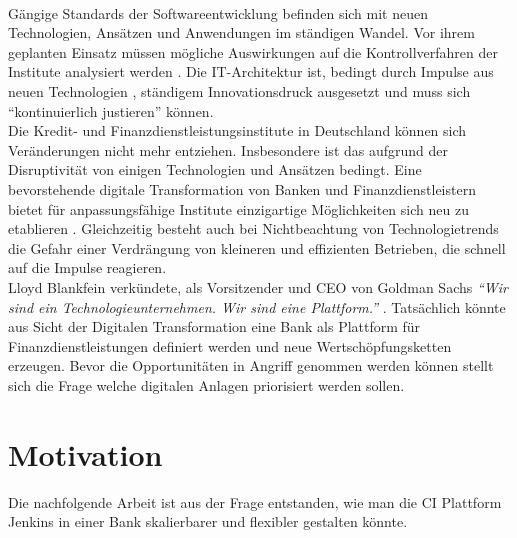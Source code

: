 \medskip
\\
Gängige Standards der Softwareentwicklung befinden sich mit neuen Technologien, Ansätzen und Anwendungen im ständigen Wandel. Vor ihrem geplanten Einsatz müssen mögliche Auswirkungen auf die Kontrollverfahren der Institute analysiert werden \cite{MaRisk:2017}.
Die IT-Architektur ist, bedingt durch Impulse aus neuen Technologien \cite{Bussmann2006}, ständigem Innovationsdruck ausgesetzt und muss sich \enquote{kontinuierlich justieren} \cite{Bussmann2006} können. 
\medskip
\\
Die Kredit- und Finanzdienstleistungsinstitute in Deutschland können sich Veränderungen nicht mehr entziehen. Insbesondere ist das aufgrund der Disruptivität von einigen Technologien \cite{Fernandez:2020} und Ansätzen bedingt. Eine bevorstehende digitale Transformation von Banken und Finanzdienstleistern bietet für anpassungsfähige Institute einzigartige Möglichkeiten sich neu zu etablieren \cite{Gupta:2017}. Gleichzeitig besteht auch bei Nichtbeachtung von Technologietrends die Gefahr einer Verdrängung von kleineren und effizienten Betrieben, die schnell auf die Impulse reagieren.
\medskip
\\
Lloyd Blankfein verkündete, als Vorsitzender und \ac{CEO} von Goldman Sachs \emph{\enquote{Wir sind ein Technologieunternehmen. Wir sind eine Plattform.}} \cite{Gupta:2017}. Tatsächlich könnte aus Sicht der Digitalen Transformation eine Bank als Plattform für Finanzdienstleistungen definiert werden und neue Wertschöpfungsketten erzeugen. 
Bevor die Opportunitäten in Angriff genommen werden können stellt sich die Frage welche digitalen Anlagen priorisiert werden sollen.
\medskip
\\
%
%
\section{Motivation}
\label{sec:intro:motivation}

Die nachfolgende Arbeit ist aus der Frage entstanden, wie man die CI Plattform Jenkins in einer Bank skalierbarer und flexibler gestalten könnte.

